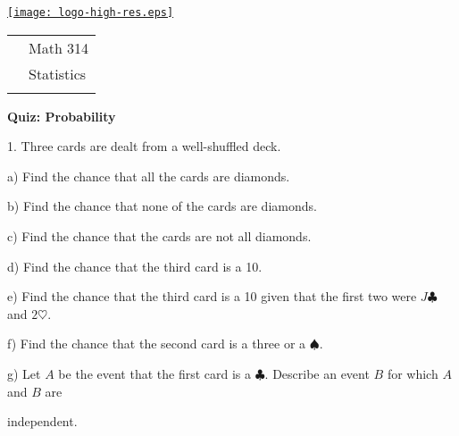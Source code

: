 \documentclass[10pt]{article}
\begin{document}
\pagestyle{empty}
\lstset{language=R, showspaces=false, showstringspaces=false}

\href{http://www.shepherd.edu}{\texttt{[image: logo-high-res.eps]}}
\vspace{-1.79cm}

{\small
\begin{tabular}{cl}
& Math 314\\
& Statistics\\
\hspace{5.28in} & %
\end{tabular}
}
\setlength{\baselineskip}{1.05\baselineskip}

\begin{center}
\textbf{\large  Quiz:  Probability}
\end{center}

1. Three cards are dealt from a well-shuffled deck.
\smallskip

\hspace{20pt} a) Find the chance that all the cards are diamonds.
\vspace{0.75in}

\hspace{20pt} b) Find the chance that none of the cards are diamonds.
\vspace{0.75in}

\hspace{20pt} c) Find the chance that the cards are not all diamonds.
\vspace{0.75in}

\hspace{20pt} d) Find the chance that the third card is a 10.
\vspace{0.75in}

\hspace{20pt} e) Find the chance that the third card is a 10 given that the first two 
were $J\clubsuit$ and $2\heartsuit$.
\vspace{0.75in}

\hspace{20pt} f) Find the chance that the second card is a three or a $\spadesuit$.
\vspace{0.75in}

\hspace{20pt} g) Let $A$ be the event that the first card is a $\clubsuit$. 
Describe an event $B$ for which $A$ and $B$ are\vspace{-3pt}

\hspace{20pt} \hphantom{g) } independent.
\vspace{1in}
\end{document}
